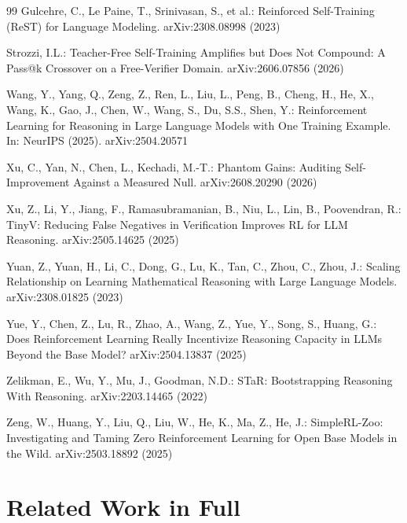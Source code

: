 \documentclass[runningheads]{llncs}
\begin{document}
\begin{thebibliography}{99}
Gulcehre, C., Le Paine, T., Srinivasan, S., et al.: Reinforced
Self-Training (ReST) for Language Modeling. arXiv:2308.08998 (2023)

Strozzi, I.L.: Teacher-Free Self-Training Amplifies but Does Not Compound:
A Pass@k Crossover on a Free-Verifier Domain. arXiv:2606.07856 (2026)

Wang, Y., Yang, Q., Zeng, Z., Ren, L., Liu, L., Peng, B., Cheng, H., He, X.,
Wang, K., Gao, J., Chen, W., Wang, S., Du, S.S., Shen, Y.: Reinforcement
Learning for Reasoning in Large Language Models with One Training Example.
In: NeurIPS (2025). arXiv:2504.20571

Xu, C., Yan, N., Chen, L., Kechadi, M.-T.: Phantom Gains: Auditing
Self-Improvement Against a Measured Null. arXiv:2608.20290 (2026)

Xu, Z., Li, Y., Jiang, F., Ramasubramanian, B., Niu, L., Lin, B.,
Poovendran, R.: TinyV: Reducing False Negatives in Verification Improves RL
for LLM Reasoning. arXiv:2505.14625 (2025)

Yuan, Z., Yuan, H., Li, C., Dong, G., Lu, K., Tan, C., Zhou, C., Zhou, J.:
Scaling Relationship on Learning Mathematical Reasoning with Large Language
Models. arXiv:2308.01825 (2023)

Yue, Y., Chen, Z., Lu, R., Zhao, A., Wang, Z., Yue, Y., Song, S., Huang,
G.: Does Reinforcement Learning Really Incentivize Reasoning Capacity in
LLMs Beyond the Base Model? arXiv:2504.13837 (2025)

Zelikman, E., Wu, Y., Mu, J., Goodman, N.D.: STaR: Bootstrapping Reasoning
With Reasoning. arXiv:2203.14465 (2022)

Zeng, W., Huang, Y., Liu, Q., Liu, W., He, K., Ma, Z., He, J.: SimpleRL-Zoo:
Investigating and Taming Zero Reinforcement Learning for Open Base Models in
the Wild. arXiv:2503.18892 (2025)

\end{thebibliography}

\appendix

\section{Related Work in Full}
\label{app:related}
\end{document}
